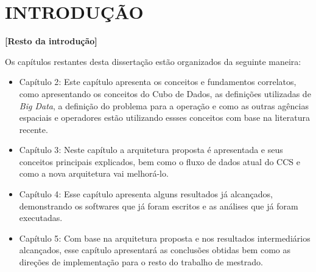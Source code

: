 
\chapter{INTRODUÇÃO}

\textbf{[Resto da introdução]}

Os capítulos restantes desta dissertação estão organizados da seguinte maneira:
\begin{itemize}
\item{Capítulo 2}: Este capítulo apresenta os conceitos e fundamentos correlatos, como apresentando os conceitos do Cubo de Dados, as definições utilizadas de \textit{Big Data}, a definição do problema para a operação e como as outras agências espaciais e operadores estão utilizando essses conceitos com base na literatura recente.
\item{Capítulo 3}: Neste capítulo a arquitetura proposta é apresentada e seus conceitos principais explicados, bem como o fluxo de dados atual do CCS e como a nova arquitetura vai melhorá-lo.
\item{Capítulo 4}: Esse capítulo apresenta alguns resultados já alcançados, demonstrando os softwares que já foram escritos e as análises que já foram executadas.
\item{Capítulo 5}: Com base na arquitetura proposta e nos resultados intermediários alcançados, esse capítulo apresentará as conclusões obtidas bem como as direções de implementação para o resto do trabalho de mestrado.
\end{itemize}

